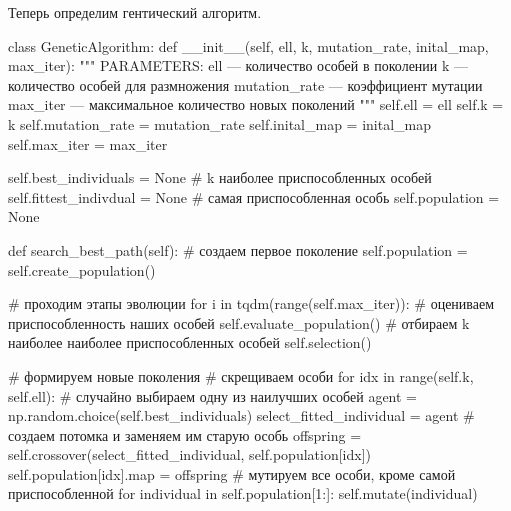 \newpage
Теперь определим гентический алгоритм.
\begin{pyin}
class GeneticAlgorithm:
  def __init__(self, ell, k, mutation_rate, inital_map, max_iter):
    """
    PARAMETERS:
    ell --- количество особей в поколении
    k --- количество особей для размножения
    mutation_rate --- коэффициент мутации
    max_iter --- максимальное количество новых поколений
    """
    self.ell = ell
    self.k = k
    self.mutation_rate = mutation_rate
    self.inital_map = inital_map
    self.max_iter = max_iter

    self.best_individuals = None # k наиболее приспособленных особей
    self.fittest_indivdual = None # самая приспособленная особь
    self.population = None

  def search_best_path(self):
    # создаем первое поколение
    self.population = self.create_population()

    # проходим этапы эволюции
    for i in tqdm(range(self.max_iter)):
       # оцениваем приспособленность наших особей
       self.evaluate_population()
       # отбираем k наиболее наиболее приспособленных особей
       self.selection()

       # формируем новые поколения
       # скрещиваем особи
       for idx in range(self.k, self.ell):
          # случайно выбираем одну из наилучших особей
          agent = np.random.choice(self.best_individuals)
          select_fitted_individual = agent
          # создаем потомка и заменяем им старую особь
          offspring = self.crossover(select_fitted_individual,
                                     self.population[idx])
          self.population[idx].map = offspring
       # мутируем все особи, кроме самой приспособленной
       for individual in self.population[1:]:
          self.mutate(individual)
\end{pyin}

